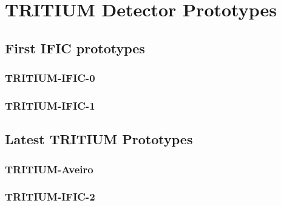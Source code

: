 \documentclass[12pt,a4paper]{book}
\begin{document}
\chapter{TRITIUM Detector Prototypes}\label{chap:Prototypes}	
	
	
	\section[First Prototypes]{First IFIC prototypes}\label{sec:Preliminary_prototypes}
	
		
		\subsection{TRITIUM-IFIC-0}\label{subsec:TritiumIFIC0}
		
		
		\subsection{TRITIUM-IFIC-1}\label{subsec:TritiumIFIC1}
		
				
	\section{Latest TRITIUM Prototypes}\label{sec:LatestTritiumPrototypes}
	
	
		\subsection{TRITIUM-Aveiro}\label{subsec:TritiumAveiro}
		
		
		\subsection{TRITIUM-IFIC-2}\label{subsec:TritiumIFIC2}
		
		
\end{document}

